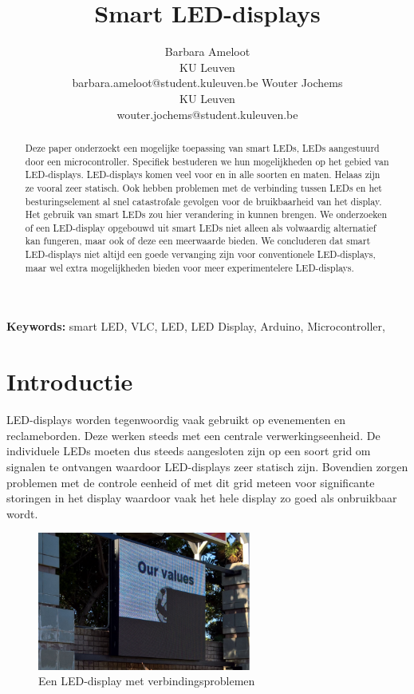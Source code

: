 \documentclass{article}
\title{Smart LED-displays}
\author{Barbara Ameloot\\
KU Leuven\\
barbara.ameloot@student.kuleuven.be
\And 
Wouter Jochems\\
KU Leuven\\
wouter.jochems@student.kuleuven.be}
\begin{document}
\maketitle

\begin{abstract}
Deze paper onderzoekt een mogelijke toepassing van smart LEDs, LEDs aangestuurd door een microcontroller\cite{smartLED}. Specifiek bestuderen we hun mogelijkheden op het gebied van LED-displays. LED-displays komen veel voor en in alle soorten en maten. Helaas zijn ze vooral zeer statisch. Ook hebben problemen met de verbinding tussen LEDs en het besturingselement al snel catastrofale gevolgen voor de bruikbaarheid van het display. Het gebruik van smart LEDs zou hier verandering in kunnen brengen. We onderzoeken of een LED-display opgebouwd uit smart LEDs niet alleen als volwaardig alternatief kan fungeren, maar ook of deze een meerwaarde bieden. We concluderen dat smart LED-displays niet altijd een goede vervanging zijn voor conventionele LED-displays, maar wel extra mogelijkheden bieden voor meer experimentelere LED-displays.
\end{abstract}

{\bf Keywords:} smart LED, VLC, LED, LED Display, Arduino, Microcontroller,


\section{Introductie}

LED-displays worden tegenwoordig vaak gebruikt op evenementen en reclameborden. Deze werken steeds met een centrale verwerkingseenheid. De individuele LEDs moeten dus steeds aangesloten zijn op een soort grid om signalen te ontvangen waardoor LED-displays zeer statisch zijn. Bovendien zorgen problemen met de controle eenheid of met dit grid meteen voor significante storingen in het display\cite{brokenDisplay} waardoor vaak het hele display zo goed als onbruikbaar wordt.
\begin{figure}
\centering
\includegraphics[width=7cm]{broken.png}
\caption{Een LED-display met verbindingsproblemen}
\end{figure}
\end{document}

